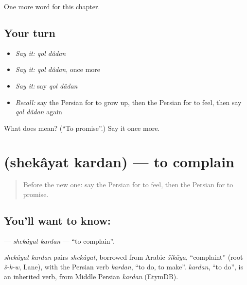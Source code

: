 \begin{grammarlens}[title={What you've built}]
One more word for this chapter.
\end{grammarlens}

\subsection*{Your turn}
\begin{itemize}
\raggedright
  \item \emph{Say it:} \emph{qol dâdan}
  \item \emph{Say it:} \emph{qol dâdan}, once more
  \item \emph{Say it:} say \emph{qol dâdan}
  \item \emph{Recall:} say the Persian for to grow up, then the Persian for to feel, then say \emph{qol dâdan} again
\end{itemize}

\begin{tcolorbox}[breakable,colback=teal!4,colframe=teal!35!black,title={Before you move on}]
What does   mean? (\textquotedblleft{}To promise\textquotedblright{}.) Say it once more.
\end{tcolorbox}
\section[\texorpdfstring{\fa{شکایت} \fa{کردن} (shekâyat kardan)}{شکایت کردن (shekâyat kardan)}]{  (shekâyat kardan) — to complain}

\label{lesson:FA-C257-shekayat-kardan}



\begin{quote}
Before the new one: say the Persian for to feel, then the Persian for to promise.
\end{quote}

\subsection*{You'll want to know:  }
\textbf{ } — \emph{shekâyat kardan} — \textquotedblleft{}to complain\textquotedblright{}.

\begin{cousinweb}
\emph{shekâyat kardan} pairs \emph{shekâyat}, borrowed from Arabic \emph{šikāya}, \textquotedblleft{}complaint\textquotedblright{} (root \emph{š-k-w}, Lane), with the Persian verb \emph{kardan}, \textquotedblleft{}to do, to make\textquotedblright{}. \emph{kardan}, \textquotedblleft{}to do\textquotedblright{}, is an inherited verb, from Middle Persian \emph{kardan} (EtymDB).
\end{cousinweb}

